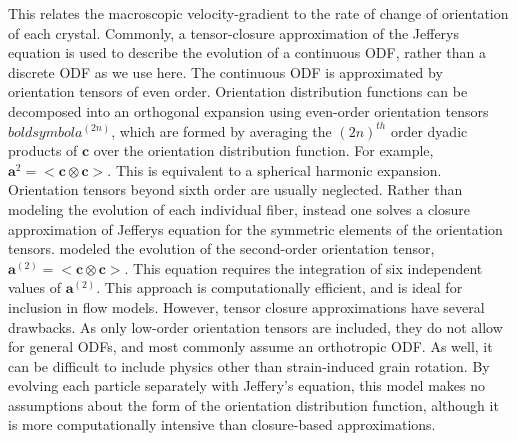 \documentclass{igs}
\begin{document}
This relates the macroscopic velocity-gradient to the rate of change of orientation of each crystal. Commonly, a tensor-closure approximation of the Jefferys equation\citep{advani1987} is used to describe the evolution of a continuous ODF, rather than a discrete ODF as we use here. The continuous ODF is approximated by orientation tensors of even order. Orientation distribution functions can be decomposed into an orthogonal expansion using even-order orientation tensors $boldsymbol{a}^{(2n)}$, which are formed by averaging the $(2n)^{th}$ order dyadic products of $\boldsymbol{c}$ over the orientation distribution function. For example, $\boldsymbol{a}^{2}=<\boldsymbol{c} \otimes \boldsymbol{c}>$. This is equivalent to a spherical harmonic expansion. Orientation tensors beyond sixth order are usually neglected. Rather than modeling the evolution of each individual fiber, instead one solves a closure approximation of Jefferys equation for the symmetric elements of the orientation tensors.  \citet{gillet2005} modeled the evolution of the second-order orientation tensor, $\boldsymbol{a}^{(2)} = <\boldsymbol{c} \otimes \boldsymbol{c}>$. This equation requires the integration of six independent values of $\boldsymbol{a}^{(2)}$. This approach is computationally efficient, and is ideal for inclusion in flow models. However, tensor closure approximations have several drawbacks. As only low-order orientation tensors are included, they do not allow for general ODFs, and most commonly assume an orthotropic ODF. As well, it can be difficult to include physics other than strain-induced grain rotation. By evolving each particle separately with Jeffery's equation, this model makes no assumptions about the form of the orientation distribution function, although it is more computationally intensive than closure-based approximations.

\end{document}
